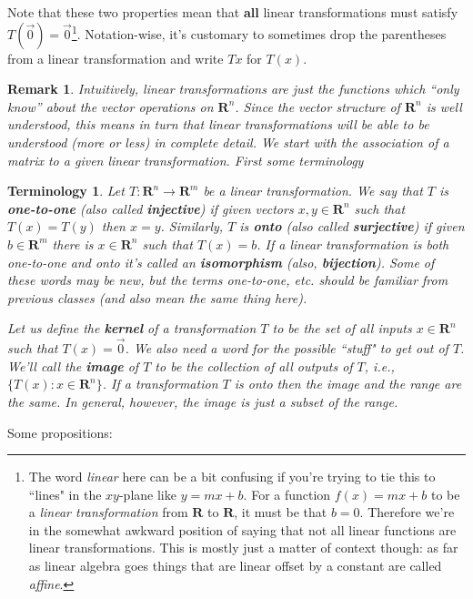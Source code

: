 \documentclass[12pt]{article}
\numberwithin{equation}{subsection}
\numberwithin{figure}{subsection}
\theoremstyle{note}
\newtheorem{remark}[subsection]{Remark}
\newtheorem{terminology}[subsection]{Terminology}
\begin{document}
Note that these two properties mean that \textbf{all} linear transformations must satisfy $T(\vec{0})=\vec{0}$\footnote{The word \textit{linear} here can be a bit confusing if you're trying to tie this to ``lines" in the $xy$-plane like $y=mx+b$. For a function $f(x)=mx+b$ to be a \textit{linear transformation} from $\mathbf{R}$ to $\mathbf{R}$, it must be that $b=0$. Therefore we're in the somewhat awkward position of saying that not all linear functions are linear transformations. This is mostly just a matter of context though: as far as linear algebra goes things that are linear offset by a constant are called \textit{affine}.}. Notation-wise, it's customary to sometimes drop the parentheses from a linear transformation and write $Tx$ for $T(x)$.
\begin{remark}
	Intuitively, linear transformations are just the functions which ``only know'' about the vector operations on $\mathbf{R}^n$. Since the vector structure of $\mathbf{R}^n$ is well understood, this means in turn that linear transformations will be able to be understood (more or less) in complete detail. We start with the association of a matrix to a given linear transformation. First some terminology
\end{remark}

\begin{terminology}
	Let $T\colon \mathbf{R}^n\to\mathbf{R}^m$ be a linear transformation. We say that $T$ is \textbf{one-to-one} (also called \textbf{injective}) if given vectors $x,y\in \mathbf{R}^n$ such that $T(x)=T(y)$ then $x=y$. Similarly, $T$ is \textbf{onto} (also called \textbf{surjective}) if given $b\in\mathbf{R}^m$ there is $x\in\mathbf{R}^n$ such that $T(x)=b$. If a linear transformation is both one-to-one and onto it's called an \textbf{isomorphism} (also, \textbf{bijection}). Some of these words may be new, but the terms \textit{one-to-one}, etc. should be familiar from previous classes (and also mean the same thing here). 
	
	Let us define the \textbf{kernel} of a transformation $T$ to be the set of all inputs $x\in\mathbf{R}^n$ such that $T(x)=\vec{0}$. We also need a word for the possible ``stuff" to get out of $T$. We'll call the \textbf{image} of $T$ to be the collection of all outputs of $T$, i.e., $\{T(x) : x\in \mathbf{R}^n\}$. If a transformation $T$ is onto then the image and the range are the same. In general, however, the image is just a subset of the range.
\end{terminology}

Some propositions:
\end{document}
